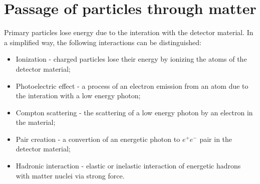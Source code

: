 \section{Passage of particles through matter} \label{sec:Passage}

Primary particles lose energy due to the interation with the detector material. In a simplified way, the following interactions can be distinguished:
\begin{itemize}
	\item Ionization - charged particles lose their energy by ionizing the atoms of the detector material;
	\item Photoelectric effect - a process of an electron emission from an atom due to the interation with a low energy photon;
	\item Compton scattering - the scattering of a low energy photon by an electron in the material;
	\item Pair creation - a convertion of an energetic photon to $e^+e^-$ pair in the detector material;
	\item Hadronic interaction - elastic or inelastic interaction of energetic hadrons with matter nuclei via strong force. 
\end{itemize}
